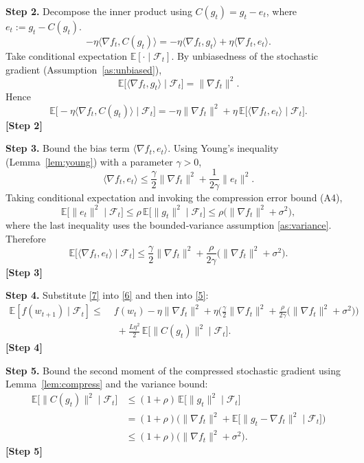 \documentclass{article}
\begin{document}
\noindent\textbf{Step 2.} Decompose the inner product using $C(g_t)=g_t-e_t$, where $e_t:=g_t-C(g_t)$.
\[
-\eta\langle\nabla f_t,C(g_t)\rangle
= -\eta\langle\nabla f_t,g_t\rangle+\eta\langle\nabla f_t,e_t\rangle .
\]
Take conditional expectation $\mathbb{E}[\cdot\mid\mathcal{F}_t]$.
By unbiasedness of the stochastic gradient (Assumption~\ref{as:unbiased}),
\[
\mathbb{E}\big[\langle\nabla f_t,g_t\rangle\mid\mathcal{F}_t\big]
= \|\nabla f_t\|^{2}.
\]
Hence
\[
\mathbb{E}\big[-\eta\langle\nabla f_t,C(g_t)\rangle\mid\mathcal{F}_t\big]
= -\eta\|\nabla f_t\|^{2}
  +\eta\,\mathbb{E}\big[\langle\nabla f_t,e_t\rangle\mid\mathcal{F}_t\big].
\tag{6}
\]
\textbf{[Step 2]}

\noindent\textbf{Step 3.} Bound the bias term $\langle\nabla f_t,e_t\rangle$.
Using Young’s inequality (Lemma~\ref{lem:young}) with a parameter $\gamma>0$,
\[
\langle\nabla f_t,e_t\rangle
\le \frac{\gamma}{2}\|\nabla f_t\|^{2}
   +\frac{1}{2\gamma}\|e_t\|^{2}.
\]
Taking conditional expectation and invoking the compression error bound (A4),
\[
\mathbb{E}\big[\|e_t\|^{2}\mid\mathcal{F}_t\big]
\le \rho\,\mathbb{E}\big[\|g_t\|^{2}\mid\mathcal{F}_t\big]
\le \rho\big(\|\nabla f_t\|^{2}+\sigma^{2}\big),
\]
where the last inequality uses the bounded‑variance assumption \ref{as:variance}.
Therefore
\[
\mathbb{E}\big[\langle\nabla f_t,e_t\rangle\mid\mathcal{F}_t\big]
\le \frac{\gamma}{2}\|\nabla f_t\|^{2}
   +\frac{\rho}{2\gamma}\big(\|\nabla f_t\|^{2}+\sigma^{2}\big).
\tag{7}
\]
\textbf{[Step 3]}

\noindent\textbf{Step 4.} Substitute \eqref{7} into \eqref{6} and then into \eqref{5}:
\[
\begin{aligned}
\mathbb{E}[f(w_{t+1})\mid\mathcal{F}_t]
\le\;& f(w_t)
      -\eta\|\nabla f_t\|^{2}
      +\eta\Big(\frac{\gamma}{2}\|\nabla f_t\|^{2}
                +\frac{\rho}{2\gamma}\big(\|\nabla f_t\|^{2}+\sigma^{2}\big)\Big) \\
      &\;+\frac{L\eta^{2}}{2}\,\mathbb{E}\!\big[\|C(g_t)\|^{2}\mid\mathcal{F}_t\big].
\end{aligned}
\tag{8}
\]
\textbf{[Step 4]}

\noindent\textbf{Step 5.} Bound the second moment of the compressed stochastic gradient using Lemma~\ref{lem:compress} and the variance bound:
\[
\begin{aligned}
\mathbb{E}\!\big[\|C(g_t)\|^{2}\mid\mathcal{F}_t\big]
&\le (1+\rho)\,\mathbb{E}\!\big[\|g_t\|^{2}\mid\mathcal{F}_t\big] \\
&= (1+\rho)\Big(\|\nabla f_t\|^{2}
      +\mathbb{E}\!\big[\|g_t-\nabla f_t\|^{2}\mid\mathcal{F}_t\big]\Big) \\
&\le (1+\rho)\big(\|\nabla f_t\|^{2}+\sigma^{2}\big).
\end{aligned}
\tag{9}
\]
\textbf{[Step 5]}
\end{document}

